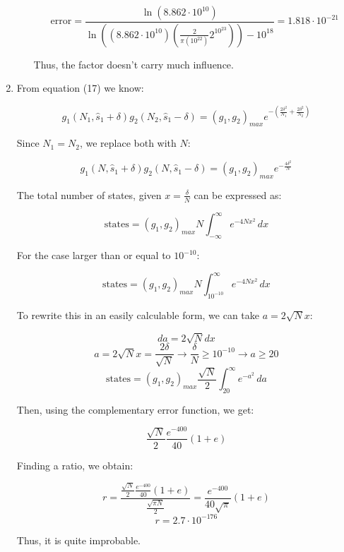 \begin{enumerate}
\begin{enumerate}
          $$\boxed{\text{error}=\frac{\ln(8.862\cdot10^{10})}{\ln((8.862\cdot10^{10})(\frac{2}{\pi (10^{22})}2^{10^{23}}))-10^{18}}=1.818\cdot10^{-21}}$$

          Thus, the factor doesn't carry much influence.

    \end{enumerate}
    
  \item

    From equation (17) we know:

        $$g_1(N_1,\hat{s}_1+\delta)g_2(N_2,\hat{s}_1-\delta)=(g_1,g_2)_{max}e^{-\left( \frac{2\delta^2}{N_1}+\frac{2\delta^2}{N_2} \right)}$$

    Since $N_1=N_2$, we replace both with $N$:

        $$g_1(N,\hat{s}_1+\delta)g_2(N,\hat{s}_1-\delta)=(g_1,g_2)_{max}e^{-\frac{4\delta^2}{N}}$$

        The total number of states, given $x=\frac{\delta}{N}$ can be expressed as:

        $$\text{states} = (g_1,g_2)_{max}N\int_{-\infty}^{\infty}e^{-4Nx^2}\,dx$$

        For the case larger than or equal to $10^{-10}$:

        $$\text{states} = (g_1,g_2)_{max}N\int_{10^{-10}}^{\infty}e^{-4Nx^2}\,dx$$

        To rewrite this in an easily calculable form, we can take $a=2\sqrt{N}x$:

        $$da=2\sqrt{N}dx$$
        $$a=2\sqrt{N}x=\frac{2\delta}{\sqrt{N}}\to \frac{\delta}{N}\geq 10^{-10}\to a\geq 20$$
        $$\text{states} = (g_1,g_2)_{max}\frac{\sqrt{N}}{2}\int_{20}^{\infty}e^{-a^2}\,da$$

        Then, using the complementary error function, we get: 

        $$\frac{\sqrt{N}}{2}\frac{e^{-400}}{40}(1+e)$$

        Finding a ratio, we obtain:

        $$r=\frac{\frac{\sqrt{N}}{2}\frac{e^{-400}}{40}(1+e)}{\frac{\sqrt{\pi N}}{2}}=\frac{e^{-400}}{40\sqrt{\pi}}(1+e)$$
        $$\boxed{r=2.7\cdot10^{-176}}$$

        Thus, it is quite improbable.

\end{enumerate}



